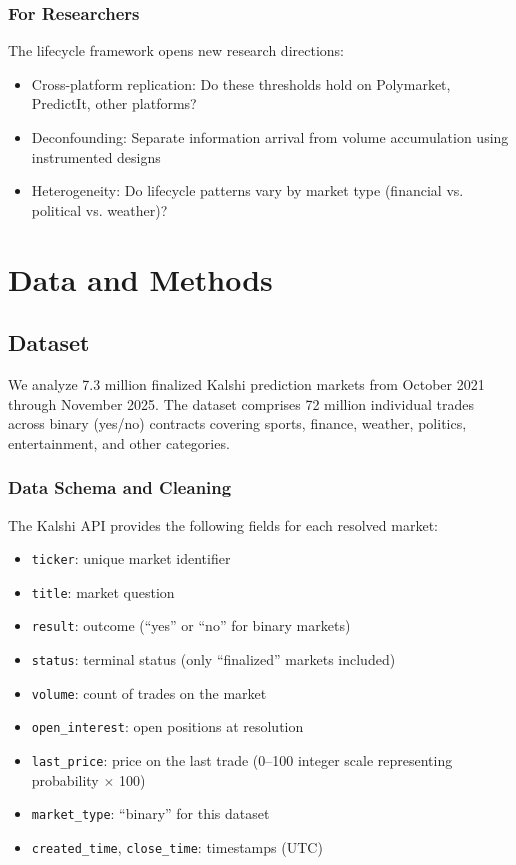 \documentclass[12pt,letterpaper]{article}
\begin{document}
\subsubsection{For Researchers}
The lifecycle framework opens new research directions:
\begin{itemize}
    \item Cross-platform replication: Do these thresholds hold on Polymarket, PredictIt, other platforms?
    \item Deconfounding: Separate information arrival from volume accumulation using instrumented designs
    \item Heterogeneity: Do lifecycle patterns vary by market type (financial vs. political vs. weather)?
\end{itemize}

\clearpage
\section{Data and Methods}\label{sec:methods}

\subsection{Dataset}

We analyze 7.3 million finalized Kalshi prediction markets from October 2021 through November 2025. The dataset comprises 72 million individual trades across binary (yes/no) contracts covering sports, finance, weather, politics, entertainment, and other categories.

\subsubsection{Data Schema and Cleaning}

The Kalshi API provides the following fields for each resolved market:
\begin{itemize}
    \item \texttt{ticker}: unique market identifier
    \item \texttt{title}: market question
    \item \texttt{result}: outcome (``yes'' or ``no'' for binary markets)
    \item \texttt{status}: terminal status (only ``finalized'' markets included)
    \item \texttt{volume}: count of trades on the market
    \item \texttt{open\_interest}: open positions at resolution
    \item \texttt{last\_price}: price on the last trade (0--100 integer scale representing probability $\times$ 100)
    \item \texttt{market\_type}: ``binary'' for this dataset
    \item \texttt{created\_time}, \texttt{close\_time}: timestamps (UTC)
\end{itemize}
\end{document}
